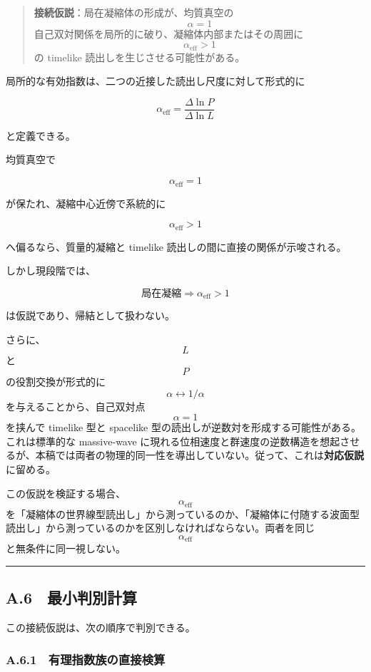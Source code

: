 \documentclass[
  a4paper,
]{ltjsarticle}
\begin{document}
\begin{quote}
\textbf{接続仮説}：局在凝縮体の形成が、均質真空の \[\alpha=1\]
自己双対関係を局所的に破り、凝縮体内部またはその周囲に
\[\alpha_{\mathrm{eff}}>1\] の timelike 読出しを生じさせる可能性がある。
\end{quote}

局所的な有効指数は、二つの近接した読出し尺度に対して形式的に

\[
\boxed{
\alpha_{\mathrm{eff}}
=
\frac{\Delta\ln P}{\Delta\ln L}
}
\tag{A25}
\]

と定義できる。

均質真空で

\[
\alpha_{\mathrm{eff}}=1
\]

が保たれ、凝縮中心近傍で系統的に

\[
\alpha_{\mathrm{eff}}>1
\]

へ偏るなら、質量的凝縮と timelike 読出しの間に直接の関係が示唆される。

しかし現段階では、

\[
\boxed{
\text{局在凝縮}
\Longrightarrow
\alpha_{\mathrm{eff}}>1
}
\]

は仮説であり、帰結として扱わない。

さらに、\[L\] と \[P\] の役割交換が形式的に
\[\alpha\leftrightarrow1/\alpha\] を与えることから、自己双対点
\[\alpha=1\] を挟んで timelike 型と spacelike
型の読出しが逆数対を形成する可能性がある。これは標準的な massive-wave
に現れる位相速度と群速度の逆数構造を想起させるが、本稿では両者の物理的同一性を導出していない。従って、これは\textbf{対応仮説}に留める。

この仮説を検証する場合、\[\alpha_{\mathrm{eff}}\]
を「凝縮体の世界線型読出し」から測っているのか、「凝縮体に付随する波面型読出し」から測っているのかを区別しなければならない。両者を同じ
\[\alpha_{\mathrm{eff}}\] と無条件に同一視しない。

\begin{center}\rule{0.5\linewidth}{0.5pt}\end{center}

\subsection{A.6　最小判別計算}\label{a.6-ux6700ux5c0fux5224ux5225ux8a08ux7b97}

この接続仮説は、次の順序で判別できる。

\subsubsection{A.6.1　有理指数族の直接検算}\label{a.6.1-ux6709ux7406ux6307ux6570ux65cfux306eux76f4ux63a5ux691cux7b97}
\end{document}
